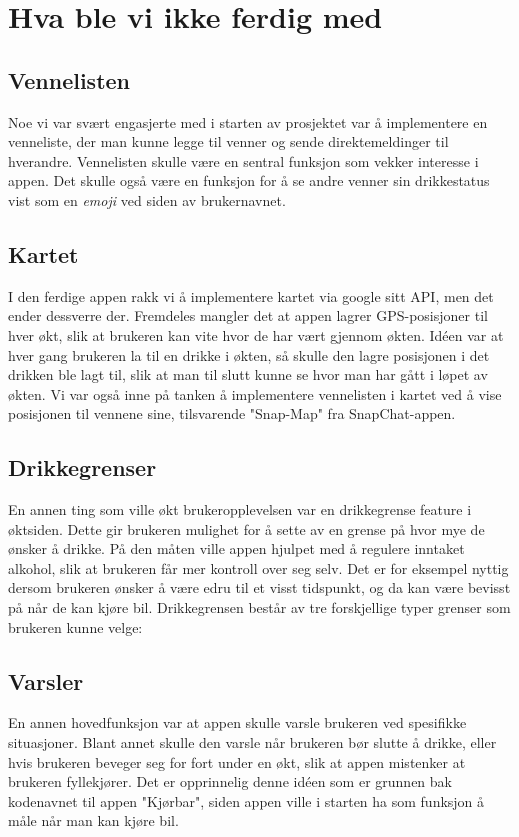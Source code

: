 \section{Hva ble vi ikke ferdig med}
\subsection{Vennelisten}
Noe vi var svært engasjerte med i starten av prosjektet var å implementere en venneliste, der man kunne legge til venner og sende direktemeldinger til hverandre. Vennelisten skulle være en sentral funksjon som vekker interesse i appen. Det skulle også være en funksjon for å se andre venner sin drikkestatus vist som en \textit{emoji} ved siden av brukernavnet.

\subsection{Kartet}
I den ferdige appen rakk vi å implementere kartet via google sitt API, men det ender dessverre der. Fremdeles mangler det at appen lagrer GPS-posisjoner til hver økt, slik at brukeren kan vite hvor de har vært gjennom økten. Idéen var at hver gang brukeren la til en drikke i økten, så skulle den lagre posisjonen i det drikken ble lagt til, slik at man til slutt kunne se hvor man har gått i løpet av økten. Vi var også inne på tanken å implementere vennelisten i kartet ved å vise posisjonen til vennene sine, tilsvarende "Snap-Map" fra SnapChat-appen.

\subsection{Drikkegrenser}
En annen ting som ville økt brukeropplevelsen var en drikkegrense feature i øktsiden. Dette gir brukeren mulighet for å sette av en grense på hvor mye de ønsker å drikke. På den måten ville appen hjulpet med å regulere inntaket alkohol, slik at brukeren får mer kontroll over seg selv. Det er for eksempel nyttig dersom brukeren ønsker å være edru til et visst tidspunkt, og da kan være bevisst på når de kan kjøre bil. Drikkegrensen består av tre forskjellige typer grenser som brukeren kunne velge:

\subsection{Varsler}
En annen hovedfunksjon var at appen skulle varsle brukeren ved spesifikke situasjoner. Blant annet skulle den varsle når brukeren bør slutte å drikke, eller hvis brukeren beveger seg for fort under en økt, slik at appen mistenker at brukeren fyllekjører. Det er opprinnelig denne idéen som er grunnen bak kodenavnet til appen "Kjørbar", siden appen ville i starten ha som funksjon å måle når man kan kjøre bil.

